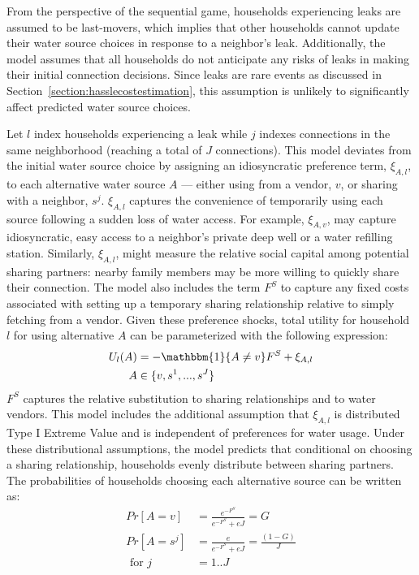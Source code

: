 \documentclass[12pt]{article}
\begin{document}
From the perspective of the sequential game, households experiencing leaks are assumed to be last-movers, which implies that other households cannot update their water source choices in response to a neighbor's leak.  Additionally, the model assumes that all households do not anticipate any risks of leaks in making their initial connection decisions.  Since leaks are rare events as discussed in Section~\ref{section:hasslecostestimation}, this assumption is unlikely to significantly affect predicted water source choices.  

Let $l$ index households experiencing a leak while $j$ indexes connections in the same neighborhood (reaching a total of $J$ connections).  This model deviates from the initial water source choice by assigning an idiosyncratic preference term, $\xi_{A,l}$, to each alternative water source $A$ --- either using from a vendor, $v$, or sharing with a neighbor, $s^{j}$.  $\xi_{A,l}$ captures the convenience of temporarily using each source following a sudden loss of water access.  For example, $\xi_{A,v}$, may capture idiosyncratic, easy access to a neighbor's private deep well or a water refilling station.  Similarly, $\xi_{A,l}$, might measure the relative social capital among potential sharing partners: nearby family members may be more willing to quickly share their connection.  The model also includes the term $F^{S}$ to capture any fixed costs associated with setting up a temporary sharing relationship relative to simply fetching from a vendor.  Given these preference shocks, total utility for household $l$ for using alternative $A$ can be parameterized with the following expression:
\begin{align}\label{equation:hassleutilities} 
\begin{split}
U_{l}(A) &= - \mathbbm{1}\{ A \neq v \} F^{S}  + \xi_{A,l} \\
A & \in \{v,s^{1},...,s^{J}\}
\end{split}
\end{align}
$F^{S}$ captures the relative substitution to sharing relationships and to water vendors.  This model includes the additional assumption that $\xi_{A,l}$ is distributed Type I Extreme Value and is independent of preferences for water usage.  Under these distributional assumptions, the model predicts that conditional on choosing a sharing relationship, households evenly distribute between sharing partners.  The probabilities of households choosing each alternative source can be written as:
\begin{align*}
Pr[A=v] &= \frac{e^{-F^{S}}}{e^{-F^{S}}+e J} = G \\
Pr[A=s^{j}] &= \frac{e}{e^{-F^{S}}+eJ} = \frac{(1-G)}{J}  \\
\text{ for } j &= 1..J
\end{align*}
\end{document}
